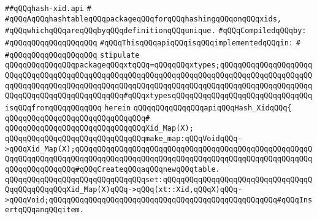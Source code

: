 \label{src/lib/x-kit/xclient/src/stuff/hash-xid.api}
\verb|##qQQqhash-xid.api|\newline
\verb|#|\newline
\verb|#qQQqAqQQqhashtableqQQqpackageqQQqforqQQqhashingqQQqonqQQqxids,|\newline
\verb|#qQQqwhichqQQqareqQQqbyqQQqdefinitionqQQqunique.|\newline
\newline
\verb|#qQQqCompiledqQQqby:|\newline
\verb|#qQQqqQQqqQQqqQQqqQQq|\newline
\newline
\newline
\verb|#qQQqThisqQQqapiqQQqisqQQqimplementedqQQqin:|\newline
\verb|#|\newline
\verb|#qQQqqQQqqQQqqQQqqQQq|\newline
\newline
\verb|stipulate|\newline
\verb|qQQqqQQqqQQqqQQqpackageqQQqxtqQQq=qQQqqQQqxtypes;qQQqqQQqqQQqqQQqqQQqqQQqqQQqqQQqqQQqqQQqqQQqqQQqqQQqqQQqqQQqqQQqqQQqqQQqqQQqqQQqqQQqqQQqqQQqqQQqqQQqqQQqqQQqqQQqqQQqqQQqqQQqqQQqqQQqqQQqqQQqqQQqqQQqqQQqqQQqqQQqqQQqqQQqqQQqqQQqqQQqqQQqqQQq#qQQqxtypesqQQqqQQqqQQqqQQqqQQqqQQqqQQqqQQqisqQQqfromqQQqqQQqqQQq|\newline
\verb|herein|\newline
\newline
\verb|qQQqqQQqqQQqqQQqapiqQQqHash_XidqQQq{|\newline
\verb|qQQqqQQqqQQqqQQqqQQqqQQqqQQqqQQq#|\newline
\verb|qQQqqQQqqQQqqQQqqQQqqQQqqQQqqQQqXid_Map(X);|\newline
\newline
\verb|qQQqqQQqqQQqqQQqqQQqqQQqqQQqqQQqmake_map:qQQqVoidqQQq->qQQqXid_Map(X);qQQqqQQqqQQqqQQqqQQqqQQqqQQqqQQqqQQqqQQqqQQqqQQqqQQqqQQqqQQqqQQqqQQqqQQqqQQqqQQqqQQqqQQqqQQqqQQqqQQqqQQqqQQqqQQqqQQqqQQqqQQqqQQqqQQqqQQqqQQq#qQQqCreateqQQqaqQQqnewqQQqtable.|\newline
\newline
\verb|qQQqqQQqqQQqqQQqqQQqqQQqqQQqqQQqset:qQQqqQQqqQQqqQQqqQQqqQQqqQQqqQQqqQQqqQQqqQQqqQQqXid_Map(X)qQQq->qQQq(xt::Xid,qQQqX)qQQq->qQQqVoid;qQQqqQQqqQQqqQQqqQQqqQQqqQQqqQQqqQQqqQQqqQQqqQQqqQQq#qQQqInsertqQQqanqQQqitem.|\newline
